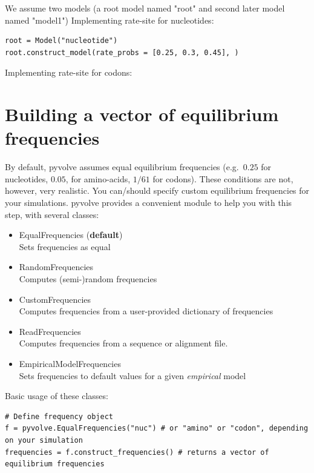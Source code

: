 \documentclass{article}
\begin{document}




We assume two models (a root model named "root" and second later model named "model1")
Implementing rate-site for nucleotides:
\begin{lstlisting}
root = Model("nucleotide")
root.construct_model(rate_probs = [0.25, 0.3, 0.45], )

\end{lstlisting}

Implementing rate-site for codons:





\section{Building a vector of equilibrium frequencies}\label{sec:freqs}

By default, pyvolve assumes equal equilibrium frequencies (e.g.\ $0.25$ for nucleotides, $0.05$, for amino-acids, $1/61$ for codons). These conditions are not, however, very realistic. You can/should specify custom equilibrium frequencies for your simulations. pyvolve provides a convenient module to help you with this step, with several classes:
\begin{itemize}
	\item EqualFrequencies (\textbf{default}) \\ Sets frequencies as equal 
	\item RandomFrequencies \\ Computes (semi-)random frequencies
	\item CustomFrequencies \\ Computes frequencies from a user-provided dictionary of frequencies
	\item ReadFrequencies \\ Computes frequencies from a sequence or alignment file.
	\item EmpiricalModelFrequencies \\ Sets frequencies to default values for a given \emph{empirical} model		
\end{itemize}

Basic usage of these classes:
\begin{lstlisting}
# Define frequency object
f = pyvolve.EqualFrequencies("nuc") # or "amino" or "codon", depending on your simulation
frequencies = f.construct_frequencies() # returns a vector of equilibrium frequencies
\end{lstlisting}
 
\end{document}
